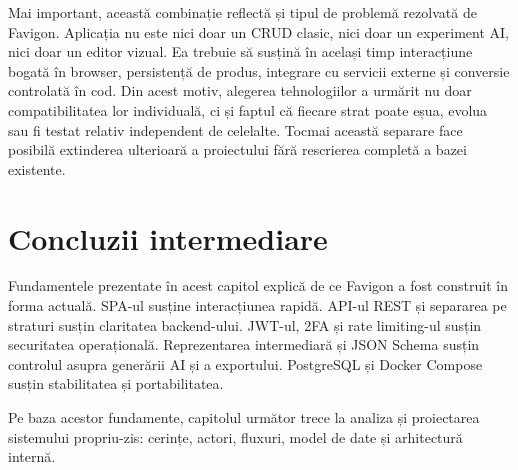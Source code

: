 Mai important, această combinație reflectă și tipul de problemă rezolvată de Favigon. Aplicația nu este nici doar un CRUD clasic, nici doar un experiment AI, nici doar un editor vizual. Ea trebuie să susțină în același timp interacțiune bogată în browser, persistență de produs, integrare cu servicii externe și conversie controlată în cod. Din acest motiv, alegerea tehnologiilor a urmărit nu doar compatibilitatea lor individuală, ci și faptul că fiecare strat poate eșua, evolua sau fi testat relativ independent de celelalte. Tocmai această separare face posibilă extinderea ulterioară a proiectului fără rescrierea completă a bazei existente.

\section{Concluzii intermediare}

Fundamentele prezentate în acest capitol explică de ce Favigon a fost construit în forma actuală. SPA-ul susține interacțiunea rapidă. API-ul REST și separarea pe straturi susțin claritatea backend-ului. JWT-ul, 2FA și rate limiting-ul susțin securitatea operațională. Reprezentarea intermediară și JSON Schema susțin controlul asupra generării AI și a exportului. PostgreSQL și Docker Compose susțin stabilitatea și portabilitatea.

Pe baza acestor fundamente, capitolul următor trece la analiza și proiectarea sistemului propriu-zis: cerințe, actori, fluxuri, model de date și arhitectură internă.


